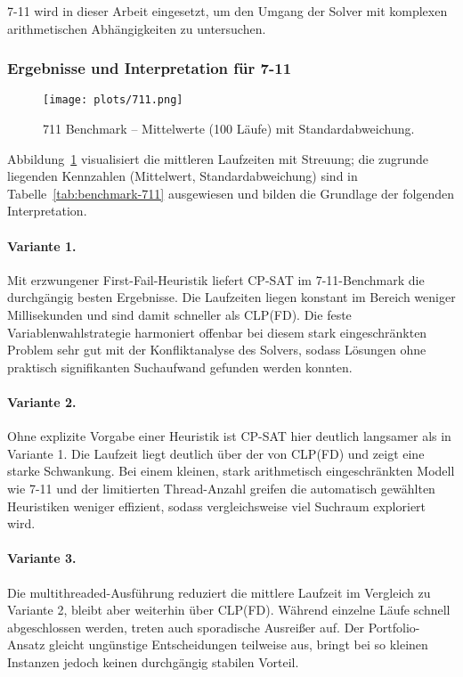 \documentclass[12pt,a4paper]{article}
\begin{document}
7-11 wird in dieser Arbeit eingesetzt, um den Umgang der Solver mit komplexen arithmetischen Abhängigkeiten zu untersuchen.
\subsubsection{Ergebnisse und Interpretation für 7-11}
\begin{figure}[H]
  \centering
  \texttt{[image: plots/711.png]}
  \caption{711 Benchmark – Mittelwerte (100 Läufe) mit Standardabweichung.}
  \label{fig:711}
\end{figure}
\noindent
Abbildung~\ref{fig:711} visualisiert die mittleren Laufzeiten mit Streuung; die zugrunde liegenden Kennzahlen (Mittelwert, Standardabweichung) sind in Tabelle~\ref{tab:benchmark-711} ausgewiesen und bilden die Grundlage der folgenden Interpretation.
\paragraph{Variante 1.}
Mit erzwungener First-Fail-Heuristik liefert CP-SAT im 7-11-Benchmark die durchgängig besten Ergebnisse.
Die Laufzeiten liegen konstant im Bereich weniger Millisekunden und sind damit schneller als CLP(FD).
Die feste Variablenwahlstrategie harmoniert offenbar bei diesem stark eingeschränkten Problem sehr gut mit der Konfliktanalyse des Solvers, sodass Lösungen ohne praktisch signifikanten Suchaufwand gefunden werden konnten.

\paragraph{Variante 2.}
Ohne explizite Vorgabe einer Heuristik ist CP-SAT hier deutlich langsamer als in Variante 1.
Die Laufzeit liegt deutlich über der von CLP(FD) und zeigt eine starke Schwankung.
Bei einem kleinen, stark arithmetisch eingeschränkten Modell wie 7-11 und der limitierten Thread-Anzahl greifen die automatisch gewählten Heuristiken weniger effizient, sodass vergleichsweise viel Suchraum exploriert wird.

\paragraph{Variante 3.}
Die multithreaded-Ausführung reduziert die mittlere Laufzeit im Vergleich zu Variante 2, bleibt aber weiterhin über CLP(FD).
Während einzelne Läufe schnell abgeschlossen werden, treten auch sporadische Ausreißer auf.
Der Portfolio-Ansatz gleicht ungünstige Entscheidungen teilweise aus, bringt bei so kleinen Instanzen jedoch keinen durchgängig stabilen Vorteil.
\\
\end{document}
